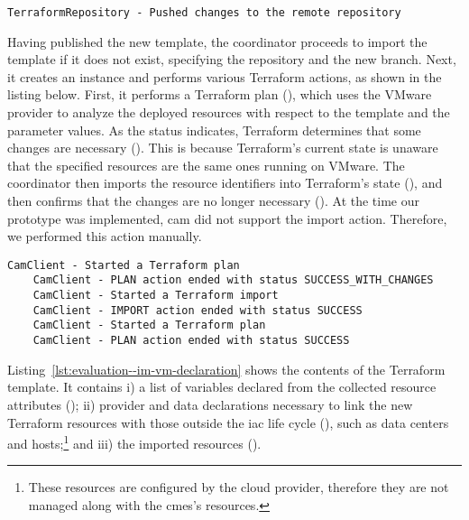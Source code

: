 \begin{mdframed}[style=consolestyle]
	\vspace{0.3em}
	\begin{lstlisting}[style=console]
	TerraformRepository - Pushed changes to the remote repository
	\end{lstlisting}
	\vspace{-0.3em}
\end{mdframed}

Having published the new template, the coordinator proceeds to import the template if it does not exist, specifying the repository and the new branch. Next, it creates an instance and performs various Terraform actions, as shown in the listing below. First, it performs a Terraform plan (), which uses the VMware provider to analyze the deployed resources with respect to the template and the parameter values. As the status indicates, Terraform determines that some changes are necessary (). This is because Terraform's current state is unaware that the specified resources are the same ones running on VMware. The coordinator then imports the resource identifiers into Terraform's state (), and then confirms that the changes are no longer necessary (). At the time our prototype was implemented, \gls{cam} did not support the import action. Therefore, we performed this action manually.

\begin{mdframed}[style=consolestyle]
	\vspace{0.3em}
	\begin{lstlisting}[style=console]
	CamClient - Started a Terraform plan
	CamClient - PLAN action ended with status SUCCESS_WITH_CHANGES
	CamClient - Started a Terraform import
	CamClient - IMPORT action ended with status SUCCESS
	CamClient - Started a Terraform plan
	CamClient - PLAN action ended with status SUCCESS
	\end{lstlisting}
	\vspace{-0.3em}
\end{mdframed}

Listing~\ref{lst:evaluation--im-vm-declaration} shows the contents of the Terraform template. It contains i) a list of variables declared from the collected resource attributes (); ii) provider and data declarations necessary to link the new Terraform resources with those outside the \gls{iac} life cycle (), such as data centers and hosts;\footnote{These resources are configured by the cloud provider, therefore they are not managed along with the \gls{cmes}'s resources.} and iii) the imported resources ().

